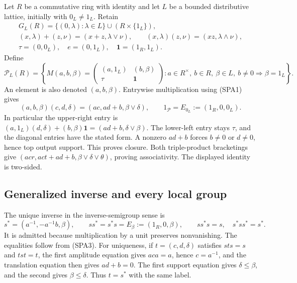 Let $R$ be a commutative ring with identity and let $L$ be a bounded
distributive lattice, initially with $0_L\ne1_L$. Retain
\begin{equation}\tag{SPA1}
\begin{gathered}
G_L(R)=\{(0,\lambda):\lambda\in L\}\cup(R\times\{1_L\}),\\
(x,\lambda)+(z,\nu)=(x+z,\lambda\vee\nu),\qquad
(x,\lambda)(z,\nu)=(xz,\lambda\wedge\nu),\\
\tau=(0,0_L),\quad e=(0,1_L),\quad\mathbf1=(1_R,1_L).
\end{gathered}
\end{equation}
Define
\begin{equation}\tag{SPA2}
\mathcal P_L(R)=
\left\{
M(a,b,\beta)=
\begin{pmatrix}(a,1_L)&(b,\beta)\\\tau&\mathbf1\end{pmatrix}:
a\in R^\times,\ b\in R,\ \beta\in L,\
b\ne0\Rightarrow\beta=1_L
\right\}.
\end{equation}
An element is also denoted $(a,b,\beta)$. Entrywise multiplication
using (SPA1) gives
\begin{equation}\tag{SPA3}
(a,b,\beta)(c,d,\delta)
=(ac,ad+b,\beta\vee\delta),\qquad
1_{\mathcal P}=E_{0_L}:=(1_R,0,0_L).
\end{equation}
In particular the upper-right entry is
$(a,1_L)(d,\delta)+(b,\beta)\mathbf1=(ad+b,\delta\vee\beta)$.
The lower-left entry stays $\tau$, and the diagonal entries
have the stated form. A nonzero $ad+b$ forces $b\ne0$ or
$d\ne0$, hence top output support. This proves closure.
Both triple-product bracketings give
$(acr,act+ad+b,\beta\vee\delta\vee\theta)$, proving associativity.
The displayed identity is two-sided.

\subsection{Generalized inverse and every local group}

The unique inverse in the inverse-semigroup sense is
\begin{equation}\tag{SPA4}
s^*=(a^{-1},-a^{-1}b,\beta),\qquad
ss^*=s^*s=E_\beta:=(1_R,0,\beta),\qquad
ss^*s=s,\quad s^*ss^*=s^*.
\end{equation}
It is admitted because multiplication by a unit preserves
nonvanishing. The equalities follow from (SPA3).
For uniqueness, if $t=(c,d,\delta)$ satisfies $sts=s$ and $tst=t$,
the first amplitude equation gives $aca=a$, hence $c=a^{-1}$,
and the translation equation then gives $ad+b=0$.
The first support equation gives $\delta\le\beta$, and the
second gives $\beta\le\delta$. Thus $t=s^*$ with the same label.

